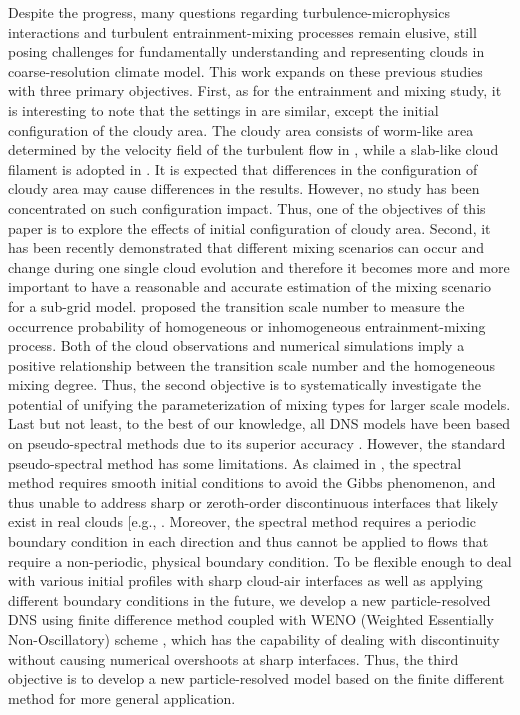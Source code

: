 Despite the progress, many questions regarding turbulence-microphysics interactions and turbulent entrainment-mixing processes remain elusive, still posing challenges for fundamentally understanding and representing clouds in coarse-resolution climate model. This work expands on these previous studies with three primary objectives. First, as for the entrainment and mixing study, it is interesting to note that the settings in \cite{Kumar12, And04} are similar, except the initial configuration of the cloudy area. The cloudy area consists of worm-like area determined by the velocity field of the turbulent flow in \cite{And04}, while a slab-like cloud filament is adopted in \cite{Kumar12}. It is expected that differences in the configuration of cloudy area may cause differences in the results. However, no study has been concentrated on such configuration impact. Thus, one of the objectives of this paper is to explore the effects of initial configuration of cloudy area. Second, it has been recently demonstrated that different mixing scenarios can occur and change during one single cloud evolution \cite{And09, Burnet1992, Lehmann09} and therefore it becomes more and more important to have a reasonable and accurate estimation of the mixing scenario for a sub-grid model. \cite{Lu2013} proposed the transition scale number to measure the occurrence probability of homogeneous or inhomogeneous entrainment-mixing process. Both of the cloud observations and numerical simulations imply a positive relationship between the transition scale number and the homogeneous mixing degree. Thus, the second objective is to systematically investigate the potential of unifying the parameterization of mixing types for larger scale models. Last but not least, to the best of our knowledge, all DNS models have been based on pseudo-spectral methods due to its superior accuracy \cite{Rogallo81, Orszag72, Celani05, Kumar12}. However, the standard pseudo-spectral method has some limitations. As claimed in \cite{Kumar12}, the spectral method requires smooth initial conditions to avoid the Gibbs phenomenon, and thus unable to address sharp or zeroth-order discontinuous interfaces that likely exist in real clouds [e.g., \cite{Brenguier1993}. Moreover, the spectral method requires a periodic boundary condition in each direction and thus cannot be applied to flows that require a non-periodic, physical boundary condition. To be flexible enough to deal with various initial profiles with sharp cloud-air interfaces as well as applying different boundary conditions in the future, we develop a new particle-resolved DNS using finite difference method coupled with WENO (Weighted Essentially Non-Oscillatory) scheme \cite{JiangShu1996}, which has the capability of dealing with discontinuity without causing numerical overshoots at sharp interfaces. Thus, the third objective is to develop a new particle-resolved model based on the finite different method for more general application.

